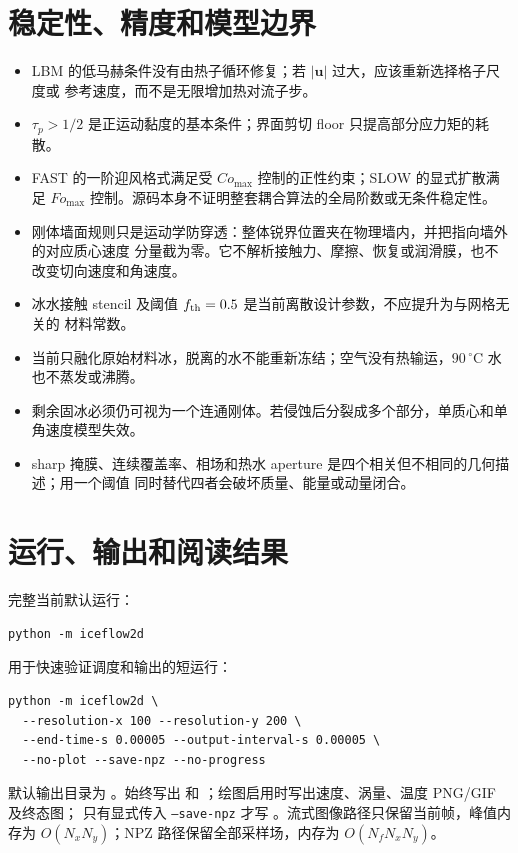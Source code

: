 \documentclass[UTF8,zihao=-4]{ctexart}
\newcommand{\vect}[1]{\boldsymbol{#1}}
\newcommand{\code}[1]{\texttt{#1}}
\numberwithin{equation}{section}
\begin{document}
\section{稳定性、精度和模型边界}

\begin{itemize}
  \item LBM 的低马赫条件没有由热子循环修复；若 $|\vect u|$ 过大，应该重新选择格子尺度或
  参考速度，而不是无限增加热对流子步。
  \item $\tau_p>1/2$ 是正运动黏度的基本条件；界面剪切 floor 只提高部分应力矩的耗散。
  \item FAST 的一阶迎风格式满足受 $Co_{\max}$ 控制的正性约束；SLOW 的显式扩散满足
  $Fo_{\max}$ 控制。源码本身不证明整套耦合算法的全局阶数或无条件稳定性。
  \item 刚体墙面规则只是运动学防穿透：整体锐界位置夹在物理墙内，并把指向墙外的对应质心速度
  分量截为零。它不解析接触力、摩擦、恢复或润滑膜，也不改变切向速度和角速度。
  \item 冰水接触 stencil 及阈值 $f_{\rm th}=0.5$ 是当前离散设计参数，不应提升为与网格无关的
  材料常数。
  \item 当前只融化原始材料冰，脱离的水不能重新冻结；空气没有热输运，$90\,^{\circ}\mathrm C$
  水也不蒸发或沸腾。
  \item 剩余固冰必须仍可视为一个连通刚体。若侵蚀后分裂成多个部分，单质心和单角速度模型失效。
  \item sharp 掩膜、连续覆盖率、相场和热水 aperture 是四个相关但不相同的几何描述；用一个阈值
  同时替代四者会破坏质量、能量或动量闭合。
\end{itemize}

\section{运行、输出和阅读结果}

完整当前默认运行：
\begin{lstlisting}[style=iceflow]
python -m iceflow2d
\end{lstlisting}

用于快速验证调度和输出的短运行：
\begin{lstlisting}[style=iceflow]
python -m iceflow2d \
  --resolution-x 100 --resolution-y 200 \
  --end-time-s 0.00005 --output-interval-s 0.00005 \
  --no-plot --save-npz --no-progress
\end{lstlisting}

默认输出目录为
。始终写出
 和 ；绘图启用时写出速度、涡量、温度 PNG/GIF 及终态图；
只有显式传入 \code{--save-npz} 才写 。流式图像路径只保留当前帧，峰值内存为
$O(N_xN_y)$；NPZ 路径保留全部采样场，内存为 $O(N_fN_xN_y)$。
\end{document}
